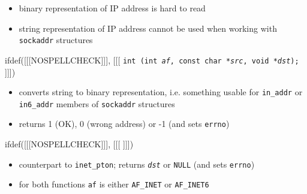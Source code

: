 \begin{slide}
\begin{itemize}
\item binary representation of IP address is hard to read
\item string representation of IP address cannot be used when working with
\texttt{sockaddr} structures
\end{itemize}
ifdef([[[NOSPELLCHECK]]], [[[
\texttt{int (int \emph{af}, const char *\emph{src},
void *\emph{dst});}
]]])
\begin{itemize}
\item converts string to binary representation, i.e. something usable for
\texttt{in\_addr} or \texttt{in6\_addr} members of \texttt{sockaddr} structures
\item returns 1 (OK), 0 (wrong address) or -1 (and sets \texttt{errno})
\end{itemize}
ifdef([[[NOSPELLCHECK]]], [[[
]]])
\begin{itemize}
\item counterpart to \texttt{inet\_pton}; returns \emph{\texttt{dst}} or
\texttt{NULL} (and sets \texttt{errno})
\end{itemize}
\begin{itemize}
\item for both functions \texttt{af} is either \texttt{AF\_INET} or
\texttt{AF\_INET6}
\end{itemize}
\end{slide}

\label{IPv4_IPv6_ADDRESSES}

